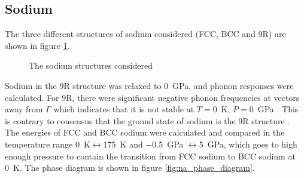 \documentclass[12pt]{article}
\begin{document}
\subsection{Sodium}
The three different structures of sodium considered (FCC, BCC and 9R) are shown in figure \ref{fig:sodium_structures}.
\begin{figure}
	\centering
	\qquad
	\qquad
	\qquad
	\caption{The sodium structures considered}
	\label{fig:sodium_structures}
\end{figure}
Sodium in the 9R structure was relaxed to \SI{0}{\giga\pascal}, and phonon responses were calculated. For 9R, there were significant negative phonon frequencies at vectors away from $\Gamma$ which indicates that it is not stable at $T=$\SI{0}{\kelvin}, $P=$\SI{0}{\giga\pascal} \cite{wallace1998thermodynamics}. 
This is contrary to consensus that the ground state of sodium is the 9R structure \cite{neaton2001constitution}\cite{degtyareva2009structure}\cite{ackland2017quantum}.
The energies of FCC and BCC sodium were calculated and compared in the temperature range \SI{0}{\kelvin}$\leftrightarrow$\SI{175}{\kelvin} and \SI{-0.5}{\giga\pascal} $\leftrightarrow $\SI{5}{\giga\pascal}, which goes to high enough pressure to contain the transition from FCC sodium to BCC sodium at \SI{0}{\kelvin}. 
The phase diagram is shown in figure \ref{fig:na_phase_diagram}.
\end{document}
